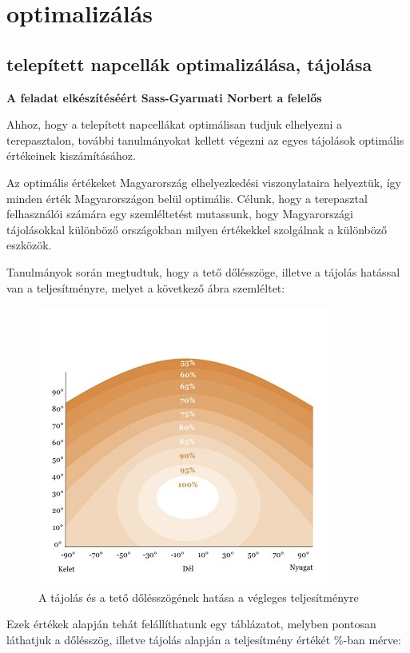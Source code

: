 \documentclass[
]{thesis-ekf}
\theoremstyle{definition}
\theoremstyle{remark}
\begin{document}
	\section{optimalizálás}
		\subsection{telepített napcellák optimalizálása, tájolása}
			 \textbf{A feladat elkészítéséért Sass-Gyarmati Norbert a felelős}
			 \par Ahhoz, hogy a telepített napcellákat optimálisan tudjuk elhelyezni a terepasztalon, további tanulmányokat kellett végezni az egyes tájolások optimális értékeinek kiszámításához. 
			 \par Az optimális értékeket Magyarország elhelyezkedési viszonylataira helyeztük, így minden érték Magyarországon belül optimális. Célunk, hogy a terepasztal felhasználói számára egy szemléltetést mutassunk, hogy Magyarországi tájolásokkal különböző országokban milyen értékekkel szolgálnak a különböző eszközök.
			 \par Tanulmányok során megtudtuk, hogy a tető dőlésszöge, illetve a tájolás hatással van a teljesítményre, melyet a következő ábra szemléltet:
			 \begin{figure}[H]
			 	\centering
			 	\includegraphics[scale=0.60]{./images/tajolas}
			 	\caption{A tájolás és a tető dőlésszögének hatása a végleges teljesítményre\cite{tajolas}}
			 \end{figure}
			 \par Ezek értékek alapján tehát felállíthatunk egy táblázatot, melyben pontosan láthatjuk a dőlésszög, illetve tájolás alapján a teljesítmény értékét \%-ban mérve:
\end{document}
